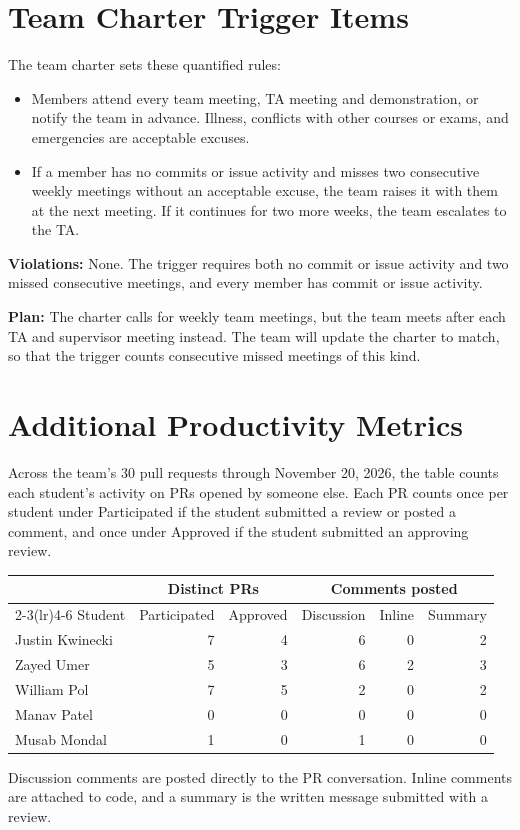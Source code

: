 \documentclass{article}
\begin{document}
\section{Team Charter Trigger Items}

The team charter sets these quantified rules:
\begin{itemize}
  \item Members attend every team meeting, TA meeting and demonstration, or
  notify the team in advance. Illness, conflicts with other courses or exams,
  and emergencies are acceptable excuses.
  \item If a member has no commits or issue activity and misses two
  consecutive weekly meetings without an acceptable excuse, the team raises it
  with them at the next meeting. If it continues for two more weeks, the team
  escalates to the TA.
\end{itemize}

\noindent \textbf{Violations: } None. The trigger requires both no commit or issue
activity and two missed consecutive meetings, and every member has commit or
issue activity.

\noindent \textbf{Plan: } The charter calls for weekly team meetings, but the
team meets after each TA and supervisor meeting instead. The team will update
the charter to match, so that the trigger counts consecutive missed meetings of
this kind.

\section{Additional Productivity Metrics}

Across the team's 30 pull requests through November 20, 2026, the table counts
each student's activity on PRs opened by someone else. Each PR counts once per
student under Participated if the student submitted a review or posted a comment,
and once under Approved if the student submitted an approving review.

\begin{table}[H]
\centering
\small
\setlength{\tabcolsep}{3pt}
\begin{tabular}{lrrrrr}
\toprule
& \multicolumn{2}{c}{Distinct PRs} & \multicolumn{3}{c}{Comments posted}\\
\cmidrule(lr){2-3}\cmidrule(lr){4-6}
Student & Participated & Approved & Discussion & Inline & Summary\\
\midrule
Justin Kwinecki & 7 & 4 & 6 & 0 & 2\\
Zayed Umer & 5 & 3 & 6 & 2 & 3\\
William Pol & 7 & 5 & 2 & 0 & 2\\
Manav Patel & 0 & 0 & 0 & 0 & 0\\
Musab Mondal & 1 & 0 & 1 & 0 & 0\\
\bottomrule
\end{tabular}
\end{table}

Discussion comments are posted directly to the PR conversation. Inline comments
are attached to code, and a summary is the written message submitted with a review.
\end{document}
